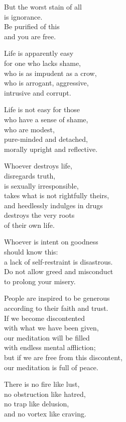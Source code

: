 But the worst stain of all\\
is ignorance.\\
Be purified of this\\
and you are free.


Life is apparently easy\\
for one who lacks shame,\\
who is as impudent as a crow,\\
who is arrogant, aggressive,\\
intrusive and corrupt.


Life is not easy for those\\
who have a sense of shame,\\
who are modest,\\
pure-minded and detached,\\
morally upright and reflective.


Whoever destroys life,\\
disregards truth,\\
is sexually irresponsible,\\
takes what is not rightfully theirs,\\
and heedlessly indulges in drugs\\
destroys the very roots\\
of their own life.


Whoever is intent on goodness\\
should know this:\\
a lack of self-restraint is disastrous.\\
Do not allow greed and misconduct\\
to prolong your misery.


People are inspired to be generous\\
according to their faith and trust.\\
If we become discontented\\
with what we have been given,\\
our meditation will be filled\\
with endless mental affliction;\\
but if we are free from this discontent,\\
our meditation is full of  peace.


There is no fire like lust,\\
no obstruction like hatred,\\
no trap like delusion,\\
and no vortex like craving.


